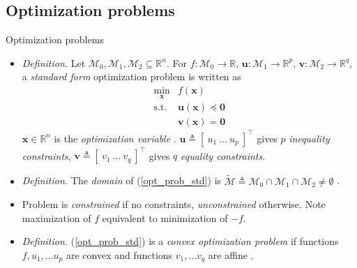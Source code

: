 \documentclass{beamer}
\numberwithin{equation}{section}
\newcommand{\aref}[1]{\alert{\ref{#1}}}
\begin{document}
\subsection{Optimization problems}

\begin{frame}{Optimization problems}
    \begin{itemize}
        \item
        \textit{Definition.} Let $ \mathcal{M}_0, \mathcal{M}_1, \mathcal{M}_2
        \subseteq \mathbb{R}^n $. For $ f: \mathcal{M}_0 \rightarrow
        \mathbb{R} $, $ \mathbf{u} : \mathcal{M}_1 \rightarrow \mathbb{R}^p $,
        $ \mathbf{v} : \mathcal{M}_2 \rightarrow \mathbb{R}^q $, a
        \textit{standard form} optimization problem is written as
        \cite{bv_convex_opt}
        \begin{equation} \label{opt_prob_std}
            \begin{array}{ll}
                \displaystyle\min_\mathbf{x} & f(\mathbf{x}) \\
                \text{s.t.} & \mathbf{u}(\mathbf{x}) \preceq \mathbf{0} \\
                & \mathbf{v}(\mathbf{x}) = \mathbf{0}
            \end{array}
        \end{equation}
        $ \mathbf{x} \in \mathbb{R}^n $ is the \textit{optimization
        variable} \cite{bv_convex_opt}. $ \mathbf{u} \triangleq
        [ \ u_1 \ \ldots \ u_p \ ]^\top $ gives $ p $ \textit{inequality
        constraints}, $ \mathbf{v} \triangleq [ \ v_1 \ \ldots \ v_q \ ]^\top $
        gives $ q $ \textit{equality constraints}.

        \item
        \textit{Definition.} The \textit{domain} of (\aref{opt_prob_std}) is
        $ \tilde{\mathcal{M}} \triangleq \mathcal{M}_0 \cap \mathcal{M}_1 \cap
        \mathcal{M}_2 \ne \emptyset $ \cite{bv_convex_opt}.

        \item
        Problem is \textit{constrained} if no constraints,
        \textit{unconstrained} otherwise. Note maximization of $ f $ 
        equivalent to minimization of $ -f $.

        \item
        \textit{Definition.} (\aref{opt_prob_std}) is a
        \textit{convex optimization problem} if functions
        $ f, u_1, \ldots u_p $ are convex and functions $ v_1, \ldots v_q $
        are affine \cite{bv_convex_opt}.
    \end{itemize}
\end{frame}
\end{document}
